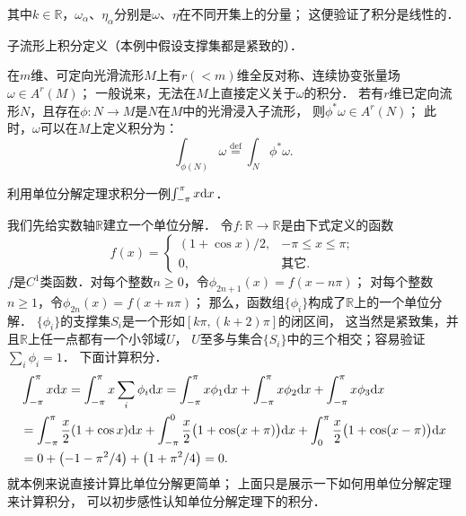 其中$k\in \mathbb{R}$，$\omega_\alpha$、$\eta_\alpha$分别是$\omega$、$\eta$在不同开集上的分量；
这便验证了积分是线性的．



\begin{example}\label{chdf:exam_IonSM}
	子流形上积分定义（本例中假设支撑集都是紧致的）．
\end{example}
在$m$维、可定向光滑流形$M$上有$r(<m)$维全反对称、连续协变张量场$\omega \in A^r(M)$；
一般说来，无法在$M$上直接定义关于$\omega$的积分．
若有$r$维已定向流形$N$，且存在$\phi: N \rightarrow M$是$N$在$M$中的光滑浸入子流形，
则$\phi^* \omega \in A^r(N)$；
此时，$\omega$可以在$M$上定义积分为：
\begin{equation}\label{chdf:eqn_IonSM}
	\int_{\phi(N)} \omega \overset{\mathrm {def}}{=} \int_N \phi^* \omega .
\end{equation}







\begin{example}
    利用单位分解定理求积分一例$\int_{-\pi}^{\pi}x {\rm d}x$．
\end{example}
我们先给实数轴$\mathbb{R}$建立一个单位分解．
令$f:\mathbb{R}\to \mathbb{R}$是由下式定义的函数
\begin{equation}
    f(x)=\begin{cases}
        (1+\cos x)/2, & -\pi \leqslant x \leqslant \pi ; \\
        0, & \text{其它} .
    \end{cases}
\end{equation}
$f$是$C^1$类函数．对每个整数$n\geqslant 0$，令$\phi_{2n+1}(x)=f(x-n \pi)$；
对每个整数$n\geqslant 1$，令$\phi_{2n}(x)=f(x+n \pi)$；
那么，函数组$\{\phi_i\}$构成了$\mathbb{R}$上的一个单位分解．
$\{\phi_i\}$的支撑集$S_i$是一个形如$[k\pi,(k+2)\pi]$的闭区间，
这当然是紧致集，并且$\mathbb{R}$上任一点都有一个小邻域$U$，
$U$至多与集合$\{S_i\}$中的三个相交；容易验证$\sum_i \phi_i =1$．
下面计算积分．
\begin{align*}
    &\int_{-\pi}^{\pi}x {\rm d}x = \int_{-\pi}^{\pi}x\sum_i\phi_i {\rm d}x
    =\int_{-\pi}^{\pi}x \phi_1 {\rm d}x 
    +\int_{-\pi}^{\pi}x \phi_2 {\rm d}x
    +\int_{-\pi}^{\pi}x \phi_3 {\rm d}x \\
    &=\int_{-\pi}^{\pi} \frac{x}{2} (1+\cos x) {\rm d}x 
    +\int_{-\pi}^{0}\frac{x}{2} \bigl(1+\cos (x+\pi)\bigr) {\rm d}x
    +\int_{0}^{\pi}\frac{x}{2} \bigl(1+\cos (x-\pi)\bigr) {\rm d}x \\
    &= 0+\left(-1-\pi^2/4\right) + \left(1+\pi^2/4\right) =0.
\end{align*}
就本例来说直接计算比单位分解更简单；
上面只是展示一下如何用单位分解定理来计算积分，
可以初步感性认知单位分解定理下的积分．




